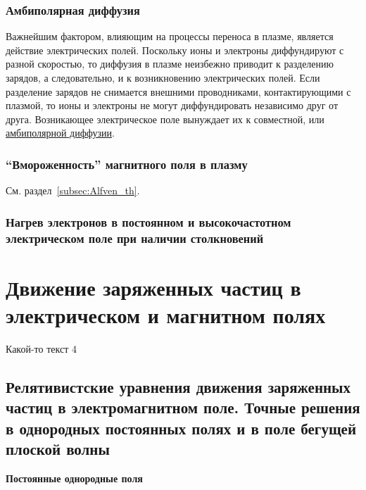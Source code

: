 \documentclass[10pt, a4paper]{article}
\let\stdsection\section
\renewcommand\section{\newpage\stdsection}
\begin{document}
\subsubsection{Амбиполярная диффузия}

Важнейшим фактором, влияющим на процессы переноса в плазме, является действие электрических полей. Поскольку ионы и электроны диффундируют с разной
скоростью, то диффузия в плазме неизбежно приводит к разделению зарядов, а следовательно, и к возникновению электрических полей. Если разделение зарядов не снимается
внешними проводниками, контактирующими с плазмой, то
ионы и электроны не могут диффундировать независимо
друг от друга. Возникающее электрическое поле вынуждает
их к совместной, или \uline{амбиполярной диффузии}.

\subsubsection{ ``Вмороженность'' магнитного поля в плазму}

См. раздел~\ref{subsec:Alfven_th}.

\subsubsection{Нагрев электронов в постоянном и высокочастотном электрическом поле при наличии столкновений}

\section{Движение заряженных частиц в электрическом и магнитном полях}

Какой-то текст 4

\subsection{Релятивистские уравнения движения заряженных частиц в электромагнитном поле. Точные решения в однородных постоянных полях и в поле бегущей плоской волны}

\textbf{Постоянные однородные поля}
\end{document}
